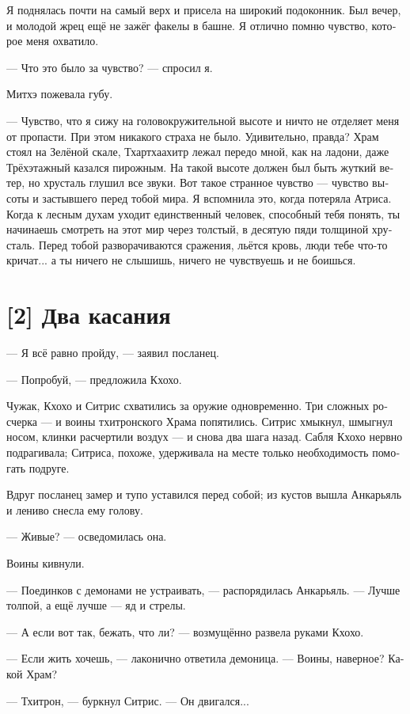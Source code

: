 \documentclass[a4paper,12pt,fleqn]{book}\usepackage{polyglossia}\setdefaultlanguage[babelshorthands=true]{russian}\setotherlanguage{english}\defaultfontfeatures{Ligatures=TeX,Mapping=tex-text}\usepackage{xcolor}\newcommand{\ml}[3]{#2}
\begin{document}
{Я поднялась почти на самый верх и присела на широкий подоконник.
Был вечер, и молодой жрец ещё не зажёг факелы в башне.
Я отлично помню чувство, которое меня охватило.

--- Что это было за чувство? --- спросил я.

Митхэ пожевала губу.

--- Чувство, что я сижу на головокружительной высоте и ничто не отделяет меня от пропасти.
При этом никакого страха не было.
Удивительно, правда?
Храм стоял на Зелёной скале, Тхартхаахитр лежал передо мной, как на ладони, даже Трёхэтажный казался пирожным.
На такой высоте должен был быть жуткий ветер, но хрусталь глушил все звуки.
Вот такое странное чувство --- чувство высоты и застывшего перед тобой мира.
Я вспомнила это, когда потеряла Атриса.
Когда к лесным духам уходит единственный человек, способный тебя понять, ты начинаешь смотреть на этот мир через толстый, в десятую пяди толщиной хрусталь.
Перед тобой разворачиваются сражения, льётся кровь, люди тебе что-то кричат... а ты ничего не слышишь, ничего не чувствуешь и не боишься.

\section{[2] Два касания}

--- Я всё равно пройду, --- заявил посланец.

--- Попробуй, --- предложила Кхохо.

Чужак, Кхохо и Ситрис схватились за оружие одновременно.
Три сложных росчерка --- и воины тхитронского Храма попятились.
Ситрис хмыкнул, шмыгнул носом, клинки расчертили воздух --- и снова два шага назад.
Сабля Кхохо нервно подрагивала;
Ситриса, похоже, удерживала на месте только необходимость помогать подруге.

Вдруг посланец замер и тупо уставился перед собой;
из кустов вышла Анкарьяль и лениво снесла ему голову.

--- Живые? --- осведомилась она.

Воины кивнули.

--- Поединков с демонами не устраивать, --- распорядилась Анкарьяль.
--- Лучше толпой, а ещё лучше --- яд и стрелы.

--- А если вот так, бежать, что ли? --- возмущённо развела руками Кхохо.

--- Если жить хочешь, --- лаконично ответила демоница.
--- Воины, наверное?
Какой Храм?

--- Тхитрон, --- буркнул Ситрис.
--- Он двигался...

}
\end{document}
